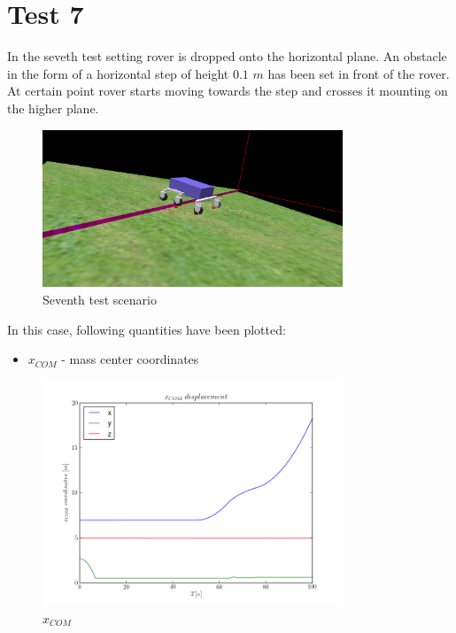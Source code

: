 \newpage
\section{Test 7}
\label{Sec:test_7}

In the seveth test setting rover is dropped onto the horizontal plane.
An obstacle in the form of a horizontal step of height $0.1$ $m$ has been set in front of the rover.
At certain point rover starts moving towards the step and crosses it mounting on the higher plane.

\begin{figure}[H]
  \centering
    \includegraphics[width=0.8\textwidth]{run_7}
  \caption{Seventh test scenario}
\end{figure}

\noindent In this case, following quantities have been plotted:

\begin{itemize}
  \item $x_{COM}$ - mass center coordinates
\end{itemize}

\begin{figure}[H]
  \centering
    \includegraphics[width=0.8\textwidth]{xCOM7}
  \caption{$x_{COM}$}
\end{figure}

